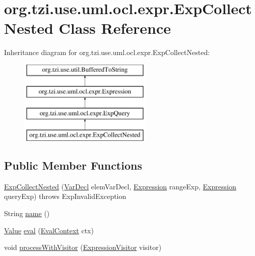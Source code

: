 \hypertarget{classorg_1_1tzi_1_1use_1_1uml_1_1ocl_1_1expr_1_1_exp_collect_nested}{\section{org.\-tzi.\-use.\-uml.\-ocl.\-expr.\-Exp\-Collect\-Nested Class Reference}
\label{classorg_1_1tzi_1_1use_1_1uml_1_1ocl_1_1expr_1_1_exp_collect_nested}
}
Inheritance diagram for org.\-tzi.\-use.\-uml.\-ocl.\-expr.\-Exp\-Collect\-Nested\-:\begin{figure}[H]
\begin{center}
\leavevmode
\includegraphics[height=4.000000cm]{classorg_1_1tzi_1_1use_1_1uml_1_1ocl_1_1expr_1_1_exp_collect_nested}
\end{center}
\end{figure}
\subsection*{Public Member Functions}
\begin{DoxyCompactItemize}
\item 
\hyperlink{classorg_1_1tzi_1_1use_1_1uml_1_1ocl_1_1expr_1_1_exp_collect_nested_a55af273e0b3883e52c539561adab120a}{Exp\-Collect\-Nested} (\hyperlink{classorg_1_1tzi_1_1use_1_1uml_1_1ocl_1_1expr_1_1_var_decl}{Var\-Decl} elem\-Var\-Decl, \hyperlink{classorg_1_1tzi_1_1use_1_1uml_1_1ocl_1_1expr_1_1_expression}{Expression} range\-Exp, \hyperlink{classorg_1_1tzi_1_1use_1_1uml_1_1ocl_1_1expr_1_1_expression}{Expression} query\-Exp)  throws Exp\-Invalid\-Exception     
\item 
String \hyperlink{classorg_1_1tzi_1_1use_1_1uml_1_1ocl_1_1expr_1_1_exp_collect_nested_a29a1e53425da847dab38fb9268db3f22}{name} ()
\item 
\hyperlink{classorg_1_1tzi_1_1use_1_1uml_1_1ocl_1_1value_1_1_value}{Value} \hyperlink{classorg_1_1tzi_1_1use_1_1uml_1_1ocl_1_1expr_1_1_exp_collect_nested_ad98109e4fa1a3db2043fb0ffb14f07d9}{eval} (\hyperlink{classorg_1_1tzi_1_1use_1_1uml_1_1ocl_1_1expr_1_1_eval_context}{Eval\-Context} ctx)
\item 
void \hyperlink{classorg_1_1tzi_1_1use_1_1uml_1_1ocl_1_1expr_1_1_exp_collect_nested_a1d31a6363fa03d65b27c2faee7598a1b}{process\-With\-Visitor} (\hyperlink{interfaceorg_1_1tzi_1_1use_1_1uml_1_1ocl_1_1expr_1_1_expression_visitor}{Expression\-Visitor} visitor)
\end{DoxyCompactItemize}
